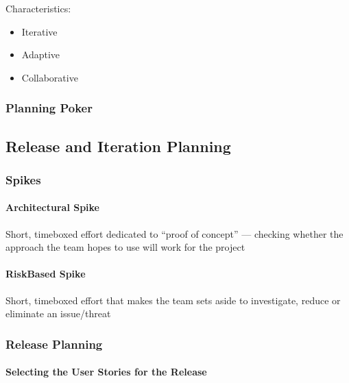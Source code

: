 \documentclass[letterpaper,10pt,english]{jupyterBook}
\begin{document}
\sphinxAtStartPar
Characteristics:
\begin{itemize}
\item {} 
\sphinxAtStartPar
Iterative

\item {} 
\sphinxAtStartPar
Adaptive

\item {} 
\sphinxAtStartPar
Collaborative

\end{itemize}


\subsubsection{Planning Poker}
\label{\detokenize{APM/agile:planning-poker}}

\subsection{Release and Iteration Planning}
\label{\detokenize{APM/agile:release-and-iteration-planning}}

\subsubsection{Spikes}
\label{\detokenize{APM/agile:spikes}}

\paragraph{Architectural Spike}
\label{\detokenize{APM/agile:architectural-spike}}
\sphinxAtStartPar
Short, timeboxed effort dedicated to “proof of concept” — checking whether the approach the team hopes to use will work for the project


\paragraph{Risk\sphinxhyphen{}Based Spike}
\label{\detokenize{APM/agile:risk-based-spike}}
\sphinxAtStartPar
Short, timeboxed effort that makes the team sets aside to investigate, reduce or eliminate an issue/threat


\subsubsection{Release Planning}
\label{\detokenize{APM/agile:release-planning}}

\paragraph{Selecting the User Stories for the Release}
\label{\detokenize{APM/agile:selecting-the-user-stories-for-the-release}}
\end{document}
